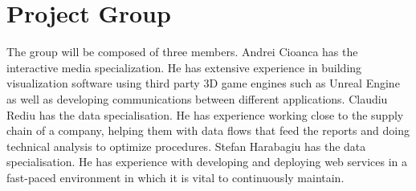 \documentclass{article}
\begin{document}
	\section{Project Group}
	The group will be composed of three members. \newline
	Andrei Cioanca has the interactive media specialization.  He has extensive experience in building visualization software using third party 3D game engines such as Unreal Engine as well as developing communications between different applications.\newline
	Claudiu Rediu has the data specialisation. He has experience working close to the supply chain of a company, helping them with data flows that feed the reports and doing technical analysis to optimize procedures.\newline
	Stefan Harabagiu has the data specialisation. He has experience with developing and deploying web services in a fast-paced environment in which it is vital to continuously maintain.
\end{document}
